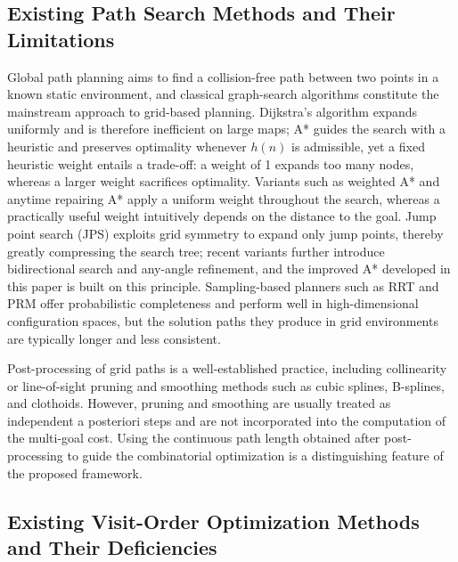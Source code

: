 \documentclass[lettersize,journal]{IEEEtran}
\begin{document}
\subsection{Existing Path Search Methods and Their Limitations}

Global path planning aims to find a collision-free path between two points in a known static environment, and classical graph-search algorithms constitute the mainstream approach to grid-based planning\textcolor{blue}{\cite{ref33,ref34,ref35}}. Dijkstra's algorithm expands uniformly and is therefore inefficient on large maps\textcolor{blue}{\cite{ref6}}; A* guides the search with a heuristic and preserves optimality whenever $h(n)$ is admissible\textcolor{blue}{\cite{ref5}}, yet a fixed heuristic weight entails a trade-off: a weight of 1 expands too many nodes, whereas a larger weight sacrifices optimality\textcolor{blue}{\cite{ref8}}. Variants such as weighted A* and anytime repairing A* apply a uniform weight throughout the search\textcolor{blue}{\cite{ref8,ref10}}, whereas a practically useful weight intuitively depends on the distance to the goal. Jump point search (JPS) exploits grid symmetry to expand only jump points, thereby greatly compressing the search tree\textcolor{blue}{\cite{ref11,ref12,ref44}}; recent variants further introduce bidirectional search and any-angle refinement\textcolor{blue}{\cite{ref13,ref14,ref15}}, and the improved A* developed in this paper is built on this principle. Sampling-based planners such as RRT\textcolor{blue}{\cite{ref7}} and PRM offer probabilistic completeness and perform well in high-dimensional configuration spaces, but the solution paths they produce in grid environments are typically longer and less consistent.

Post-processing of grid paths is a well-established practice, including collinearity or line-of-sight pruning\textcolor{blue}{\cite{ref16}} and smoothing methods such as cubic splines, B-splines, and clothoids\textcolor{blue}{\cite{ref17,ref18,ref41}}. However, pruning and smoothing are usually treated as independent a posteriori steps and are not incorporated into the computation of the multi-goal cost. Using the continuous path length obtained after post-processing to guide the combinatorial optimization is a distinguishing feature of the proposed framework.

\subsection{Existing Visit-Order Optimization Methods and Their Deficiencies}
\end{document}
